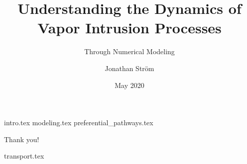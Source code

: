 \documentclass{beamer}
\title{Understanding the Dynamics of Vapor Intrusion Processes}
\subtitle{Through Numerical Modeling}
\author{Jonathan Ström}
\institute{Brown University \\ School of Engineering}
\date{May 2020}
\begin{document}
\frame{\titlepage}

{intro.tex}
{modeling.tex}
{preferential_pathways.tex}

\begin{frame}
  \centering
  \huge Thank you!
\end{frame}

\begin{frame}[allowframebreaks]
\printbibliography
\end{frame}

{transport.tex}

\begin{comment}
\AtBeginSection[]
{
  \begin{frame}
    \frametitle{Table of Contents}
    \tableofcontents[currentsection]
  \end{frame}
}



Goal: ~20 slides with real content. 35-40 minute presentation.
~5 for introduction
~2 for modeling
~5 for ASU house & CPM analysis
~3 for advection/diffusion
~2 for ITS and pressure

-: Perspective on indoor air quality & radon
-: VI introduction
-: VI investigations
-: Attenuation factors (their uses) and VI investigation empiricism problems
-: Numerical modeling in VI
  -- VI investigations highly empirical
  -- Difficult to understand due to complexity of sites
  -- First-principles modeling allows us to unravel this complexity (sensitivity analysis) & investigate physical phenomena
-: Background of VI modeling
  -- Analytical models, i.e. J&E
    -- Cannot be modified - of limited use
  -- Numerical models
    -- More generalizable, but can be more difficult to use
    -- A few have been developed but not well-used in VI investigations
    -- Not used in a transient setting
-: Use models to explore in particular temporal variability


-: Examining ASU house and CPM (and issues with the assumptions)
-: ASU house background
-: CPM
-: ASU house model
-: Replicating ASU results
-: Introducing

-: Which site conditions give rise to advective dominated entry?
-: Soil and foundation types

-: ITS (issues with ITS approach, similar to )

-: Predicting indoor contaminant concentration using weather as ITS (proxy for pressure)




What do I want to say?


\end{comment}
\end{document}
